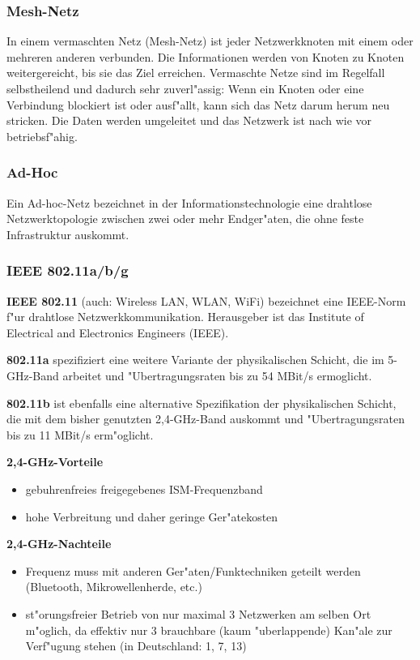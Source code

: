 \subsubsection{Mesh-Netz}

In einem vermaschten Netz (Mesh-Netz) ist jeder Netzwerkknoten mit einem
oder mehreren anderen verbunden. Die Informationen werden von Knoten
zu Knoten weitergereicht, bis sie das Ziel erreichen. Vermaschte
Netze sind im Regelfall selbstheilend und dadurch sehr zuverl"assig:
Wenn ein Knoten oder eine Verbindung blockiert ist oder ausf"allt, kann
sich das Netz darum herum neu stricken. Die Daten werden umgeleitet und
das Netzwerk ist nach wie vor betriebsf"ahig. 

\subsubsection{Ad-Hoc}

Ein Ad-hoc-Netz bezeichnet in der Informationstechnologie eine drahtlose
Netzwerktopologie zwischen zwei oder mehr Endger"aten, die ohne feste
Infrastruktur auskommt.

\subsubsection{IEEE 802.11a/b/g}

\textbf{IEEE 802.11} (auch: Wireless LAN, WLAN, WiFi) bezeichnet eine IEEE-Norm
f"ur drahtlose Netzwerkkommunikation. Herausgeber ist das Institute of
Electrical and Electronics Engineers (IEEE).

\textbf{802.11a} spezifiziert eine weitere Variante der physikalischen Schicht,
die im 5-GHz-Band arbeitet und "Ubertragungsraten bis zu 54 MBit/s
ermoglicht. 

\textbf{802.11b} ist ebenfalls eine alternative Spezifikation der physikalischen
Schicht, die mit dem bisher genutzten 2,4-GHz-Band auskommt und
"Ubertragungsraten bis zu 11 MBit/s erm"oglicht. 

\textbf{2,4-GHz-Vorteile}
\begin{itemize}	
	\item gebuhrenfreies freigegebenes ISM-Frequenzband 
	\item hohe Verbreitung und daher geringe Ger"atekosten 
\end{itemize}

\textbf{2,4-GHz-Nachteile}
\begin{itemize}	
	\item Frequenz muss mit anderen Ger"aten/Funktechniken geteilt werden
	(Bluetooth, Mikrowellenherde, etc.) 
	\item st"orungsfreier Betrieb von nur maximal 3 Netzwerken
	am selben Ort m"oglich, da effektiv nur 3 brauchbare
	(kaum "uberlappende) Kan"ale zur Verf"ugung stehen
	(in Deutschland: 1, 7, 13) 
\end{itemize}

